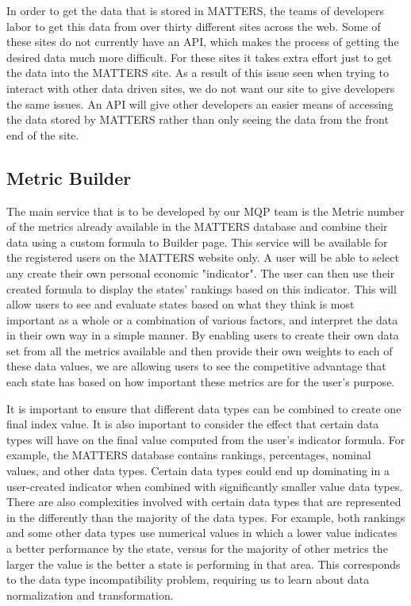 		In order to get the data that is stored in MATTERS, the teams of developers 
		labor to get this data from over thirty different sites across the web. Some 
		of these sites do not currently have an API, which makes the process of 
		getting the desired data much more difficult. For these sites it takes 
		extra effort just to get the data into the MATTERS site. As a result of 
		this issue seen when trying to interact with other data driven sites, we 
		do not want our site to give developers the same issues. An API will give 
		other developers an easier means of accessing the data stored by MATTERS 
		rather than only seeing the data from the front end of the site.

	\subsection{Metric Builder}

		The main service that is to be developed by our MQP team is the Metric 
		number of the metrics already available in the MATTERS database and 
		combine their data using a custom formula to Builder page. This service 
		will be available for the registered users on the MATTERS website only. 
		A user will be able to select any create their own personal economic 
		"indicator". The user can then use their created formula to display the 
		states' rankings based on this indicator. This will allow users to see 
		and evaluate states based on what they think is most important as a 
		whole or a combination of various factors, and interpret the data in 
		their own way in a simple manner. By enabling users to create their own 
		data set from all the metrics available and then provide their own 
		weights to each of these data values, we are allowing users to see the 
		competitive advantage that each state has based on how important these 
		metrics are for the user's purpose.

		It is important to ensure that different data types can be combined to 
		create one final index value. It is also important to consider the 
		effect that certain data types will have on the final value computed 
		from the user's indicator formula. For example, the MATTERS database 
		contains rankings, percentages, nominal values, and other data types. 
		Certain data types could end up dominating in a user-created indicator 
		when combined with significantly smaller value data types. There are 
		also complexities involved with certain data types that are represented 
		in the differently than the majority of the data types. For example, both 
		rankings and some other data types use numerical values in which a lower 
		value indicates a better performance by the state, versus for the 
		majority of other metrics the larger the value is the better a state is 
		performing in that area. This corresponds to the data type 
		incompatibility problem, requiring us to learn about data normalization 
		and transformation. 

